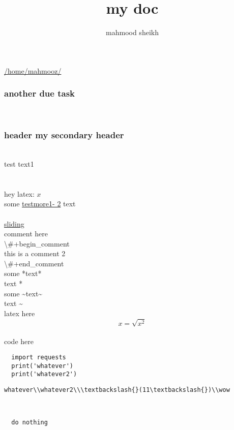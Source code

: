 \documentclass[11pt]{article}
\author{mahmood sheikh}
\title{my doc}
\begin{document}
\href{/home/mahmooz/}{/home/mahmooz/}\\\subsubsection{another due task}\\\subsubsection{header my secondary header}\\test text1\\\\\\hey latex: \(x\)\\some \href{here1}{testmore1- 2} text\\\href{sliding.gif}{}\\\href{sliding}{sliding}\\comment here\\\textbackslash{}\#+begin\_comment\\this is a comment 2\\\textbackslash{}\#+end\_comment\\some *text*\\text *\\some \textasciitilde{}text\textasciitilde{}\\text \textasciitilde{}\\latex here\\\[ x = \sqrt{x^2} \]\\code here\\\begin{lstlisting}  import requests
  print('whatever')
  print('whatever2')
\end{lstlisting}

\begin{lstlisting}whatever\\whatever2\\\textbackslash{}(11\textbackslash{})\\wow\end{lstlisting}\\\begin{lstlisting}  do nothing
\end{lstlisting}
\end{document}
